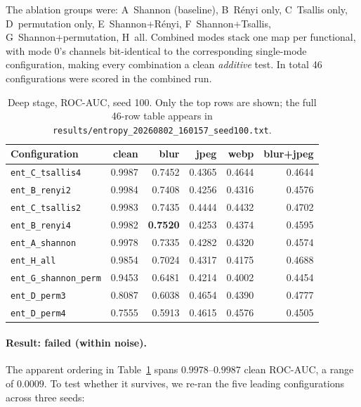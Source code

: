 The ablation groups were: A~Shannon (baseline), B~Rényi only, C~Tsallis only,
D~permutation only, E~Shannon+Rényi, F~Shannon+Tsallis, G~Shannon+permutation,
H~all. Combined modes stack one map per functional, with mode 0's channels
bit-identical to the corresponding single-mode configuration, making every
combination a clean \emph{additive} test. In total 46 configurations were
scored in the combined run.

\begin{table}[t]
  \centering
  \caption{Deep stage, ROC-AUC, seed 100. Only the top rows are shown; the full
  46-row table appears in \texttt{results/entropy\_20260802\_160157\_seed100.txt}.}
  \label{tab:entropy-deep}
  \begin{tabular}{lrrrrr}
    \toprule
    Configuration & clean & blur & jpeg & webp & blur+jpeg \\
    \midrule
    \texttt{ent\_C\_tsallis4}  & 0.9987 & 0.7452 & 0.4365 & 0.4644 & 0.4644 \\
    \texttt{ent\_B\_renyi2}    & 0.9984 & 0.7408 & 0.4256 & 0.4316 & 0.4576 \\
    \texttt{ent\_C\_tsallis2}  & 0.9983 & 0.7435 & 0.4444 & 0.4432 & 0.4702 \\
    \texttt{ent\_B\_renyi4}    & 0.9982 & \textbf{0.7520} & 0.4253 & 0.4374 & 0.4595 \\
    \texttt{ent\_A\_shannon}   & 0.9978 & 0.7335 & 0.4282 & 0.4320 & 0.4574 \\
    \midrule
    \texttt{ent\_H\_all}       & 0.9854 & 0.7024 & 0.4317 & 0.4175 & 0.4688 \\
    \texttt{ent\_G\_shannon\_perm} & 0.9453 & 0.6481 & 0.4214 & 0.4002 & 0.4454 \\
    \texttt{ent\_D\_perm3}     & 0.8087 & 0.6038 & 0.4654 & 0.4390 & 0.4777 \\
    \texttt{ent\_D\_perm4}     & 0.7555 & 0.5913 & 0.4615 & 0.4576 & 0.4505 \\
    \bottomrule
  \end{tabular}
\end{table}

\paragraph{Result: failed (within noise).} The apparent ordering in
Table~\ref{tab:entropy-deep} spans $0.9978$--$0.9987$ clean ROC-AUC, a range of
$0.0009$. To test whether it survives, we re-ran the five leading
configurations across three seeds:

